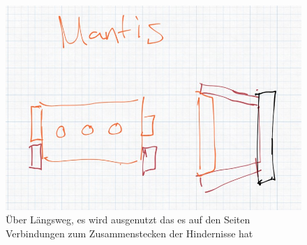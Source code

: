 \begin{figure}[h!]
    \centering
    \begin{minipage}{0.45\textwidth}
        \centering
        \includegraphics[width=\textwidth]{img/technologierecherche/Aufnahme/Mantis.jpg}
        \caption{Über Längsweg, es wird ausgenutzt das es auf den Seiten Verbindungen zum Zusammenstecken der Hindernisse hat}
        \label{img:tech_Mantis}
    \end{minipage}
    \hfill
\end{figure}


\newpage
